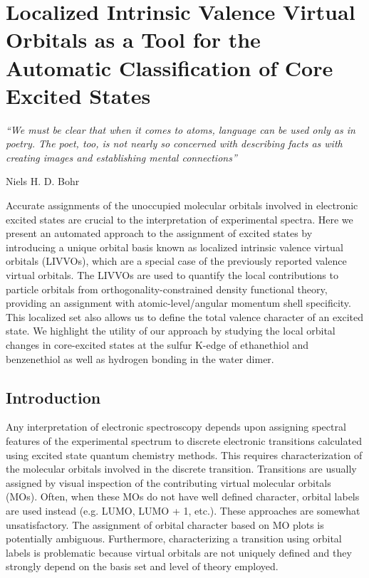 \documentclass{article}
\begin{document}
\chapter{Localized Intrinsic Valence Virtual Orbitals as a Tool for the Automatic Classification of Core Excited States}
\epigraph{\textit{``We must be clear that when it comes to atoms, language can be used only as in poetry. The poet, too, is not nearly so concerned with describing facts as with creating images and establishing mental connections''}}{Niels H. D. Bohr}
\begin{chapabstract}
Accurate assignments of the unoccupied molecular orbitals involved in electronic excited states are crucial to the interpretation of experimental spectra. Here we present an automated approach to the assignment of excited states by introducing a unique orbital basis known as localized intrinsic valence virtual orbitals (LIVVOs), which are a special case of the previously reported valence virtual orbitals. The LIVVOs are used to quantify the local contributions to particle orbitals from orthogonality-constrained density functional theory, providing an assignment with atomic-level/angular momentum shell specificity. This localized set also allows us to define the total valence character of an excited state. We highlight the utility of our approach by studying the local orbital changes in core-excited states at the sulfur K-edge of ethanethiol and benzenethiol as well as hydrogen bonding in the water dimer.
\end{chapabstract}
\section{Introduction}
Any interpretation of electronic spectroscopy depends upon assigning spectral features of the experimental spectrum to discrete electronic transitions calculated using excited state quantum chemistry methods. This requires characterization of the molecular orbitals involved in the discrete transition. Transitions are usually assigned by visual inspection of the contributing virtual molecular orbitals (MOs). Often, when these MOs do not have well defined character, orbital labels are used instead (e.g. LUMO, LUMO + 1, etc.). These approaches are somewhat unsatisfactory. The assignment of orbital character based on MO plots is potentially ambiguous. Furthermore, characterizing a transition using orbital labels is problematic because virtual orbitals are not uniquely defined and they strongly depend on the basis set and level of theory employed. 
\end{document}
